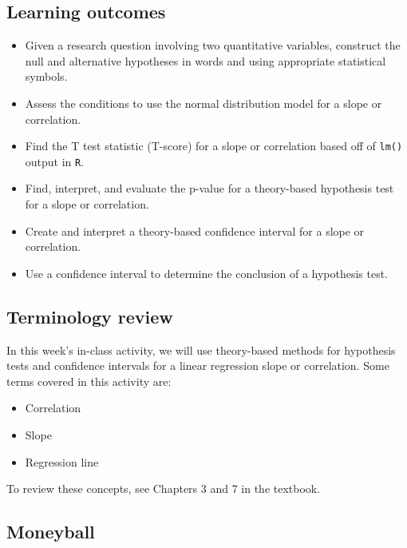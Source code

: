 \documentclass[
]{report}
\begin{document}

\hypertarget{learning-outcomes-10}{%
\subsection{Learning outcomes}\label{learning-outcomes-10}}

\begin{itemize}
\item
  Given a research question involving two quantitative variables, construct the null and alternative hypotheses
  in words and using appropriate statistical symbols.
\item
  Assess the conditions to use the normal distribution model for a slope or correlation.
\item
  Find the T test statistic (T-score) for a slope or correlation based off of \texttt{lm()} output in \texttt{R}.
\item
  Find, interpret, and evaluate the p-value for a theory-based hypothesis test for a slope or correlation.
\item
  Create and interpret a theory-based confidence interval for a slope or correlation.
\item
  Use a confidence interval to determine the conclusion of a hypothesis test.
\end{itemize}

\hypertarget{terminology-review-25}{%
\subsection{Terminology review}\label{terminology-review-25}}

In this week's in-class activity, we will use theory-based methods for hypothesis tests and confidence intervals for a linear regression slope or correlation. Some terms covered in this activity are:

\begin{itemize}
\item
  Correlation
\item
  Slope
\item
  Regression line
\end{itemize}

To review these concepts, see Chapters 3 and 7 in the textbook.

\hypertarget{moneyball-1}{%
\subsection{Moneyball}\label{moneyball-1}}
\end{document}
